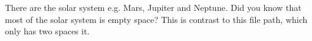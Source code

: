 There are \DIFdelbegin {}\DIFdelend \DIFaddbegin {}\DIFaddend the solar system e.g. Mars, Jupiter and Neptune.
Did you know that most of the solar system is empty space?
This is \DIFdelbegin {}\DIFdelend \DIFaddbegin {}\DIFaddend contrast to this file path, which only has two spaces \DIFdelbegin {}\DIFdelend \DIFaddbegin {}\DIFaddend it.
